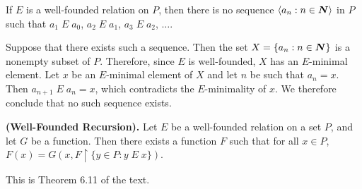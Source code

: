  If $E$ is a well-founded relation on $P$, then there is no 
sequence $\langle a_n : n \in \boldsymbol{N} \rangle$ in $P$ such that $a_1 \; E \; a_0$,
 $a_2 \; E \; a_1$, $a_3 \; E \; a_2$, $\ldots$.
\begin{solution}
Suppose that there exists such a sequence. Then the set 
$X = \{ a_n : n \in \boldsymbol{N} \}$ is a nonempty subset of $P$. Therefore, since $E$ 
is well-founded, $X$ has an $E$-minimal element. Let $x$ be an $E$-minimal 
element of $X$ and let $n$ be such that $a_n = x$. Then 
$a_{n + 1} \; E \; a_n = x$, which contradicts the $E$-minimality of $x$. 
We therefore conclude that no such sequence exists.
\end{solution}

 \textbf{(Well-Founded Recursion).} Let $E$ be a well-founded 
relation on a set $P$, and let $G$ be a function. Then there exists a function 
$F$ such that for all 
$x \in P$, $F(x) = G(x, F \upharpoonright \{ y \in P : y \; E \; x \})$.
\begin{solution}
This is Theorem 6.11 of the text.
\end{solution}